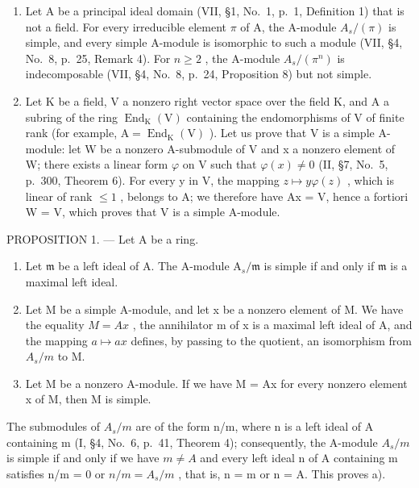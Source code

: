 \begin{enumerate}
\def\labelenumi{\arabic{enumi})}
\setcounter{enumi}{1}
\item
  Let A be a principal ideal domain (VII, §1, No.~1, p.~1, Definition 1) that is not a field. For every irreducible element \(\pi\) of A, the A-module \(A_s / (\pi)\) is simple, and every simple A-module is isomorphic to such a module (VII, §4, No.~8, p.~25, Remark 4). For \(n \geqslant 2\) , the A-module \(A_s / (\pi^n)\) is indecomposable (VII, §4, No.~8, p.~24, Proposition 8) but not simple.
\item
  Let K be a field, V a nonzero right vector space over the field K, and A a subring of the ring \(\operatorname{End}_{\mathrm{K}}(\mathrm{V})\) containing the endomorphisms of V of finite rank (for example, \(\mathrm{A} = \operatorname{End}_{\mathrm{K}}(\mathrm{V})\) ). Let us prove that V is a simple A-module: let W be a nonzero A-submodule of V and x a nonzero element of W; there exists a linear form \(\varphi\) on V such that \(\varphi(x) \neq 0\) (II, §7, No.~5, p.~300, Theorem 6). For every y in V, the mapping \(z \mapsto y\varphi(z)\) , which is linear of rank \(\leqslant 1\) , belongs to A; we therefore have Ax = V, hence a fortiori W = V, which proves that V is a simple A-module.
\end{enumerate}

PROPOSITION 1. --- Let A be a ring.

\begin{enumerate}
\def\labelenumi{\alph{enumi})}
\item
  Let \(\mathfrak{m}\) be a left ideal of A. The A-module \(\mathrm{A}_s / \mathfrak{m}\) is simple if and only if \(\mathfrak{m}\) is a maximal left ideal.
\item
  Let M be a simple A-module, and let x be a nonzero element of M. We have the equality \(M = Ax\) , the annihilator m of x is a maximal left ideal of A, and the mapping \(a \mapsto ax\) defines, by passing to the quotient, an isomorphism from \(A_{s}/m\) to M.
\item
  Let M be a nonzero A-module. If we have M = Ax for every nonzero element x of M, then M is simple.
\end{enumerate}

The submodules of \(A_{s}/m\) are of the form n/m, where n is a left ideal of A containing m (I, §4, No.~6, p.~41, Theorem 4); consequently, the A-module \(A_{s}/m\) is simple if and only if we have \(m \neq A\) and every left ideal n of A containing m satisfies n/m = 0 or \(n/m = A_{s}/m\) , that is, n = m or n = A. This proves a).

